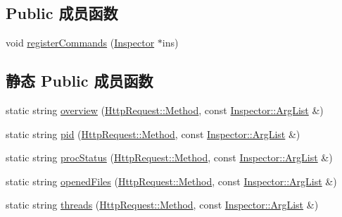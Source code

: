 \subsection*{Public 成员函数}
\begin{DoxyCompactItemize}
\item 
void \hyperlink{classmuduo_1_1net_1_1ProcessInspector_ac4da0c5db63e529c730df0c77175882e}{register\+Commands} (\hyperlink{classmuduo_1_1net_1_1Inspector}{Inspector} $\ast$ins)
\end{DoxyCompactItemize}
\subsection*{静态 Public 成员函数}
\begin{DoxyCompactItemize}
\item 
static string \hyperlink{classmuduo_1_1net_1_1ProcessInspector_a6c5dee6f9bf1f45afb67379698a87ecb}{overview} (\hyperlink{classmuduo_1_1net_1_1HttpRequest_a2a3c0067e44c5ef3210a256d06c16b0f}{Http\+Request\+::\+Method}, const \hyperlink{classmuduo_1_1net_1_1Inspector_aa22799cd3b4f56688d431d68c2d014a0}{Inspector\+::\+Arg\+List} \&)
\item 
static string \hyperlink{classmuduo_1_1net_1_1ProcessInspector_acd372e8294af88238110be78aaeffb50}{pid} (\hyperlink{classmuduo_1_1net_1_1HttpRequest_a2a3c0067e44c5ef3210a256d06c16b0f}{Http\+Request\+::\+Method}, const \hyperlink{classmuduo_1_1net_1_1Inspector_aa22799cd3b4f56688d431d68c2d014a0}{Inspector\+::\+Arg\+List} \&)
\item 
static string \hyperlink{classmuduo_1_1net_1_1ProcessInspector_ac65b454f271f0e115549d0f2f8eb49bb}{proc\+Status} (\hyperlink{classmuduo_1_1net_1_1HttpRequest_a2a3c0067e44c5ef3210a256d06c16b0f}{Http\+Request\+::\+Method}, const \hyperlink{classmuduo_1_1net_1_1Inspector_aa22799cd3b4f56688d431d68c2d014a0}{Inspector\+::\+Arg\+List} \&)
\item 
static string \hyperlink{classmuduo_1_1net_1_1ProcessInspector_a592bc6f5c15abc09e7bc7bded42fa9d2}{opened\+Files} (\hyperlink{classmuduo_1_1net_1_1HttpRequest_a2a3c0067e44c5ef3210a256d06c16b0f}{Http\+Request\+::\+Method}, const \hyperlink{classmuduo_1_1net_1_1Inspector_aa22799cd3b4f56688d431d68c2d014a0}{Inspector\+::\+Arg\+List} \&)
\item 
static string \hyperlink{classmuduo_1_1net_1_1ProcessInspector_a78eb2231493036c5b06b2247d133c85d}{threads} (\hyperlink{classmuduo_1_1net_1_1HttpRequest_a2a3c0067e44c5ef3210a256d06c16b0f}{Http\+Request\+::\+Method}, const \hyperlink{classmuduo_1_1net_1_1Inspector_aa22799cd3b4f56688d431d68c2d014a0}{Inspector\+::\+Arg\+List} \&)
\end{DoxyCompactItemize}
